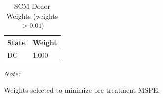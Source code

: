 \begin{table}[!h]
\centering
\caption{SCM Donor Weights (weights $> 0.01$)}
\centering
\begin{threeparttable}
\begin{tabular}[t]{ll}
\toprule
State & Weight\\
\midrule
DC & 1.000\\
\bottomrule
\end{tabular}
\begin{tablenotes}
\item \textit{Note: } 
\item Weights selected to minimize pre-treatment MSPE.
\end{tablenotes}
\end{threeparttable}
\end{table}
